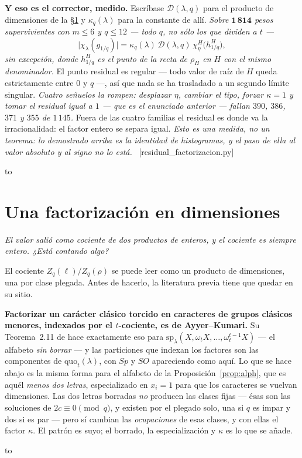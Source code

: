 \documentclass[11pt,a4paper]{article}
\newcommand{\ver}[1]{\unskip\penalty0\ \textcolor{azul}{\small\textsf{[#1]}}}
\newenvironment{keybox}
  {\par\vspace{9pt}\begin{lrbox}{\fichabox}%
   \begin{minipage}{0.90\textwidth}\vspace{7pt}\setlength{\parskip}{3pt}}
  {\vspace{7pt}\end{minipage}\end{lrbox}%
   \par\noindent\hbox to \textwidth{\hfill
   \textcolor{azul}{\rule[-\dp\fichabox]{3.2pt}{\dimexpr\ht\fichabox+\dp\fichabox\relax}}%
   \colorbox{fondoficha}{\usebox{\fichabox}}\hfill}%
   \par\vspace{9pt}}
\begin{document}
\begin{keybox}
\textbf{Y eso es el corrector, medido.} Escríbase $\mathcal D(\lambda,q)$ para el producto de
dimensiones de la \S\ref{sec:dims} y $\kappa_q(\lambda)$ para la constante de allí. \emph{Sobre
$\mathbf{1\,814}$ pesos supervivientes con $m\le6$ y $q\le12$ --- todo $q$, no sólo los que
dividen a $t$ ---}
\[
\bigl|\chi_\lambda(g_{1/q})\bigr|
=\kappa_q(\lambda)\,\mathcal D(\lambda,q)\,\chi^{H}_{\eta}\bigl(h^{H}_{1/q}\bigr),
\]
\emph{sin excepción, donde $h^H_{1/q}$ es el punto de la recta de $\rho_H$ en $H$ con el mismo
denominador.} El punto residual es regular --- todo valor de raíz de $H$ queda estrictamente entre
$0$ y $q$ ---, así que nada se ha trasladado a un segundo límite singular. \emph{Cuatro señuelos la
rompen: desplazar $\eta$, cambiar el tipo, forzar $\kappa=1$ y tomar el residual igual a $1$ ---
que es el enunciado anterior --- fallan $390$, $386$, $371$ y $355$ de $1\,145$.} Fuera de las
cuatro familias el residual es donde va la irracionalidad: el factor entero se separa igual.
\emph{Esto es una medida, no un teorema: lo demostrado arriba es la identidad de histogramas, y el
paso de ella al valor absoluto y al signo no lo está.}
\ver{residual\_factorizacion.py}
\end{keybox}

\section{Una factorización en dimensiones}\label{sec:dims}

\noindent\emph{El valor salió como cociente de dos productos de enteros, y el cociente es siempre entero. ¿Está contando algo?}

El cociente $Z_q(\ell)/Z_q(\rho)$ se puede leer como un producto de dimensiones, una por clase
plegada. Antes de hacerlo, la literatura previa tiene que quedar en su sitio.

\begin{keybox}
\textbf{Factorizar un carácter clásico torcido en caracteres de grupos clásicos menores, indexados
por el $t$-cociente, es de Ayyer--Kumari.} Su Teorema~2.11 de \cite{AK22} hace exactamente eso para
$\mathrm{sp}_\lambda(X,\omega_tX,\dots,\omega_t^{t-1}X)$ --- el alfabeto \emph{sin borrar} --- y las
particiones que indexan los factores son las componentes de $\mathrm{quo}_t(\lambda)$, con $Sp$ y
$SO$ apareciendo como aquí. Lo que se hace abajo es la misma forma para el alfabeto de la
Proposición~\ref{prop:alph}, que es aquél \emph{menos dos letras}, especializado en $x_i=1$ para que
los caracteres se vuelvan dimensiones. Las dos letras borradas \emph{no} producen las clases fijas
--- ésas son las soluciones de $2c\equiv0\pmod q$, y existen por el plegado solo, una si $q$ es impar
y dos si es par --- pero sí cambian las \emph{ocupaciones} de esas clases, y con ellas el factor
$\kappa$. El patrón es suyo; el borrado, la especialización y $\kappa$ es lo que se
añade.
\end{keybox}
\end{document}
